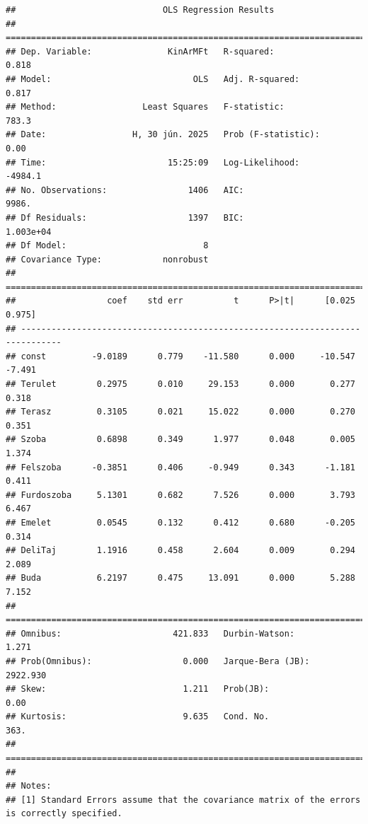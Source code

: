 \documentclass[
]{book}
\begin{document}
\begin{verbatim}
##                             OLS Regression Results                            
## ==============================================================================
## Dep. Variable:               KinArMFt   R-squared:                       0.818
## Model:                            OLS   Adj. R-squared:                  0.817
## Method:                 Least Squares   F-statistic:                     783.3
## Date:                 H, 30 jún. 2025   Prob (F-statistic):               0.00
## Time:                        15:25:09   Log-Likelihood:                -4984.1
## No. Observations:                1406   AIC:                             9986.
## Df Residuals:                    1397   BIC:                         1.003e+04
## Df Model:                           8                                         
## Covariance Type:            nonrobust                                         
## ==============================================================================
##                  coef    std err          t      P>|t|      [0.025      0.975]
## ------------------------------------------------------------------------------
## const         -9.0189      0.779    -11.580      0.000     -10.547      -7.491
## Terulet        0.2975      0.010     29.153      0.000       0.277       0.318
## Terasz         0.3105      0.021     15.022      0.000       0.270       0.351
## Szoba          0.6898      0.349      1.977      0.048       0.005       1.374
## Felszoba      -0.3851      0.406     -0.949      0.343      -1.181       0.411
## Furdoszoba     5.1301      0.682      7.526      0.000       3.793       6.467
## Emelet         0.0545      0.132      0.412      0.680      -0.205       0.314
## DeliTaj        1.1916      0.458      2.604      0.009       0.294       2.089
## Buda           6.2197      0.475     13.091      0.000       5.288       7.152
## ==============================================================================
## Omnibus:                      421.833   Durbin-Watson:                   1.271
## Prob(Omnibus):                  0.000   Jarque-Bera (JB):             2922.930
## Skew:                           1.211   Prob(JB):                         0.00
## Kurtosis:                       9.635   Cond. No.                         363.
## ==============================================================================
## 
## Notes:
## [1] Standard Errors assume that the covariance matrix of the errors is correctly specified.
\end{verbatim}
\end{document}
